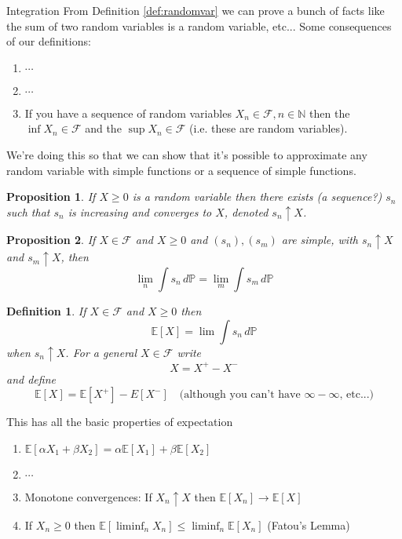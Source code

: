 \documentclass[12pt]{article}
\newtheorem{definition}{Definition}
\newtheorem{proposition}{Proposition}
\begin{document}
\begin{section}{Integration}
\noindent From Definition \ref{def:randomvar} we can prove a bunch of facts like the sum of two random variables is a random variable, etc... Some consequences of our definitions:
\begin{enumerate}
	\item $\cdots$
	\item $\cdots$
	\item If you have a sequence of random variables $X_n \in \mathcal F, n \in \mathbb N$ then the $\inf X_n \in \mathcal F$ and the $\sup X_n \in \mathcal F$ (i.e. these are random variables).
\end{enumerate}

\noindent We're doing this so that we can show that it's possible to approximate any random variable with simple functions or a sequence of simple functions.

\begin{proposition} If $X \geq 0$ is a random variable then there exists (a sequence?) $s_n$ such that $s_n$ is increasing and converges to $X$, denoted $s_n \uparrow X$.
\end{proposition}

\begin{proposition} If $X \in \mathcal F$ and $X\geq0$ and $(s_n), (s_m)$ are simple, with $s_n\uparrow X$ and $s_m\uparrow X$, then
\begin{equation*}
	\lim_n \int s_n\,d\mathbb P = \lim_m \int s_m\,d\mathbb P
\end{equation*}
\end{proposition}

\begin{definition} If $X \in \mathcal F$ and $X \geq 0$ then
\begin{equation*}
	\mathbb E[X] = \lim \int s_n\,d\mathbb P
\end{equation*}
when $s_n\uparrow X$. For a general $X \in \mathcal F$ write
\begin{equation*}
	X = X^+ - X^-
\end{equation*}
and define
\begin{equation*}
	\mathbb E[X] = \mathbb E[X^+] - E[X^-] \quad \text{(although you can't have $\infty - \infty$, etc...)}
\end{equation*}
\end{definition}

\noindent This has all the basic properties of expectation
\begin{enumerate}
	\item $\mathbb E[\alpha X_1 + \beta X_2] =  \alpha\mathbb E[X_1] + \beta\mathbb E[X_2]$
	\item $\cdots$
	\item Monotone convergences: If $X_n\uparrow X$ then $\mathbb E[X_n] \longrightarrow \mathbb E[X]$
	\item If $X_n \geq 0$ then $\mathbb E[\liminf_n X_n] \leq \liminf_n \mathbb E[X_n]$ (Fatou's Lemma)
\end{enumerate}


\end{section}
\end{document}
